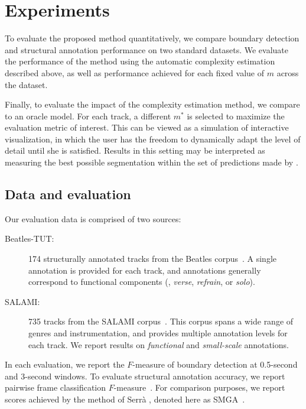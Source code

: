 \documentclass{article}
\begin{document}

\section{Experiments}
To evaluate the proposed method quantitatively, we compare boundary detection and
structural annotation performance on two standard datasets.  We evaluate the
performance of the method using the automatic complexity estimation described above,
as well as performance achieved for each fixed value of $m$ across the dataset.

Finally, to evaluate the impact of the complexity estimation method, we compare to an
oracle model. For each track, a different $m^*$ is selected to maximize the
evaluation metric of interest.  This can be viewed as a simulation of interactive
visualization, in which the user has the freedom to dynamically adapt the level of
detail until she is satisfied.  Results in this setting may be interpreted as
measuring the best possible segmentation within the set of predictions made by
.

\subsection{Data and evaluation}
Our evaluation data is comprised of two sources:
\begin{description}
\item[Beatles-TUT:]
174 structurally annotated tracks from the Beatles corpus~\cite{paulus2006music}.  A single
annotation is provided for each track, and annotations generally correspond to
functional components (\eg, \emph{verse}, \emph{refrain}, or \emph{solo}).
\item[SALAMI:] 735 tracks from the SALAMI corpus~\cite{smith2011design}.  This corpus
spans a wide range of genres and instrumentation, and provides multiple
annotation levels for each track.  We report results on \emph{functional} 
and \emph{small-scale} annotations.
\end{description}

In each evaluation, we report the $F$-measure of boundary detection at 0.5-second and
3-second windows.  To evaluate structural annotation accuracy, we report pairwise frame 
classification $F$-measure~\cite{levy2008structural}.  
For comparison purposes, we report scores achieved by the method of 
Serr\`{a} \etal, denoted here as SMGA~\cite{serra2014unsupervised}.
\end{document}
